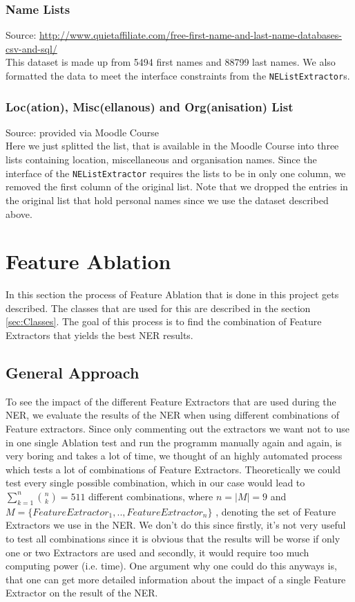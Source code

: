 \documentclass[11pt, english]{article}
\begin{document}
\subsubsection*{Name Lists}
Source: \url{http://www.quietaffiliate.com/free-first-name-and-last-name-databases-csv-and-sql/}\\
This dataset is made up from 5494 first names and 88799 last names. We also formatted the data to meet the interface constraints from the \verb/NEListExtractor/s. 

\subsubsection*{Loc(ation), Misc(ellanous) and Org(anisation) List}
Source: provided via Moodle Course\\
Here we just splitted the list, that is available in the Moodle Course into three lists containing location, miscellaneous and organisation names. Since the interface of the \verb/NEListExtractor/ requires the lists to be in only one column, we removed the first column of the original list. Note that we dropped the entries in the original list that hold personal names since we use the dataset described above.



\section{Feature Ablation}
\label{sec:Ablation}
In this section the process of Feature Ablation that is done in this project gets described. The classes that are used for this are described in the section \ref{sec:Classes}. The goal of this process is to find the combination of Feature Extractors that yields the best NER results.

\subsection{General Approach}
\label{sec:AblationApproach}
To see the impact of the different Feature Extractors that are used during the NER, we evaluate the results of the NER when using different combinations of Feature extractors. Since only commenting out the extractors we want not to use in one single Ablation test and run the programm manually again and again, is very boring and takes a lot of time, we thought of an highly automated process which tests a lot of combinations of Feature Extractors. Theoretically we could test every single possible combination, which in our case would lead to $\sum_{k=1}^{n}\binom{n}{k} = 511$ different combinations, where $n = \left | M \right | = 9$ and $M = \{ FeatureExtractor_1, ..,  FeatureExtractor_n \}$ , denoting the set of Feature Extractors we use in the NER. We don't do this since firstly, it's not very useful to test all combinations since it is obvious that the results will be worse if only one or two Extractors are used and secondly, it would require too much computing power (i.e. time). One argument why one could do this anyways is, that one can get more detailed information about the impact of a single Feature Extractor on the result of the NER.
\end{document}
